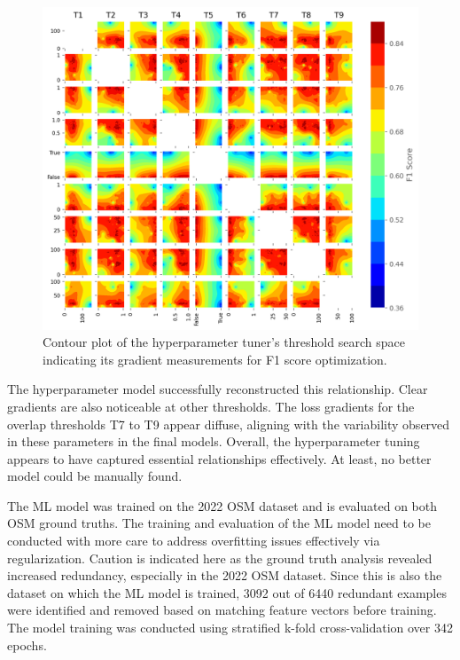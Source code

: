 \begin{figure}[t]
\centering 
\includegraphics[width=\linewidth]{images/matching-hpt-contour-topological-osm-updated.png}
\caption{Contour plot of the hyperparameter tuner's threshold search space indicating its gradient measurements for F1 score optimization.}
\label{fig:hyperparameter-contourplot}
\end{figure}

The hyperparameter model successfully reconstructed this relationship. Clear gradients are also noticeable at other thresholds. The loss gradients for the overlap thresholds T7 to T9 appear diffuse, aligning with the variability observed in these parameters in the final models. Overall, the hyperparameter tuning appears to have captured essential relationships effectively. At least, no better model could be manually found.

The ML model was trained on the 2022 OSM dataset and is evaluated on both OSM ground truths. The training and evaluation of the ML model need to be conducted with more care to address overfitting issues effectively via regularization. Caution is indicated here as the ground truth analysis revealed increased redundancy, especially in the 2022 OSM dataset. Since this is also the dataset on which the ML model is trained, 3092 out of 6440 redundant examples were identified and removed based on matching feature vectors before training. The model training was conducted using stratified k-fold cross-validation over 342 epochs.

